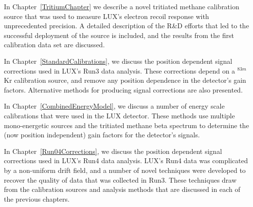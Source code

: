 In Chapter~\ref{TritiumChapter} we describe a novel tritiated methane calibration source that was used to measure LUX's electron recoil response with unprecedented precision.  A detailed description of the R\&D efforts that led to the successful deployment of the source is included, and the results from the first calibration data set are discussed.


 In Chapter~\ref{StandardCalibrations}, we discuss the position dependent signal corrections used in LUX's Run3 data analysis.  These corrections depend on a $^{83m}$Kr calibration source, and remove any position dependence in the detector's gain factors. Alternative methods for producing signal corrections are also presented.
 
 In Chapter~\ref{CombinedEnergyModel}, we discuss a number of energy scale calibrations that were used in the LUX detector.  These methods use multiple mono-energetic sources and the tritiated methane beta spectrum to determine the (now position independent) gain factors for the detector's signals.  
 
 In Chapter~\ref{Run04Corrections}, we discuss the position dependent signal corrections used in LUX's Run4 data analysis.  LUX's Run4 data was complicated by a non-uniform drift field, and a number of novel techniques were developed to recover the quality of data that was collected in Run3.  These techniques draw from the calibration sources and analysis methods that are discussed in each of the previous chapters.